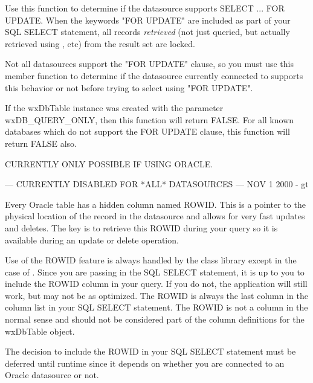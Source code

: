 
Use this function to determine if the datasource supports SELECT ... FOR UPDATE.
When the keywords "FOR UPDATE" are included as part of your SQL SELECT statement,
all records {\it retrieved} (not just queried, but actually retrieved using 
, etc) from the result set are 
locked.  


Not all datasources support the "FOR UPDATE" clause, so you must use this
member function to determine if the datasource currently connected to supports
this behavior or not before trying to select using "FOR UPDATE".

If the wxDbTable instance was created with the parameter wxDB_QUERY_ONLY, then 
this function will return FALSE.  For all known databases which do not support 
the FOR UPDATE clause, this function will return FALSE also.


\label{wxdbtablecanupdatebyrowid}


CURRENTLY ONLY POSSIBLE IF USING ORACLE.  

--- CURRENTLY DISABLED FOR *ALL* DATASOURCES --- NOV 1 2000 - gt

Every Oracle table has a hidden column named ROWID.  This is a pointer to the
physical location of the record in the datasource and allows for very fast 
updates and deletes.  The key is to retrieve this ROWID during your query so
it is available during an update or delete operation. 

Use of the ROWID feature is always handled by the class library except in the 
case of .  Since 
you are passing in the SQL SELECT statement, 
it is up to you to include the ROWID column in your query.  If you do not, 
the application will still work, but may not be as optimized.  The ROWID is 
always the last column in the column list in your SQL SELECT statement.  
The ROWID is not a column in the normal sense and should not be considered 
part of the column definitions for the wxDbTable object.


The decision to include the ROWID in your SQL SELECT statement must be 
deferred until runtime since it depends on whether you are connected 
to an Oracle datasource or not.


